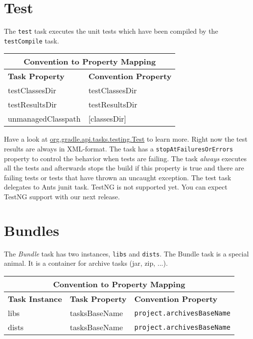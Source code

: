 \section{Test} %
\label{sec:test}
The \texttt{test} task executes the unit tests which have been compiled by the \texttt{testCompile} task. 
\begin{center}
	\begin{tabular}{|l|l|} \hline
		\multicolumn{2}{|c|}{Convention to Property Mapping} \\ \hline
	    \textbf{Task Property} & \textbf{Convention Property} \\ \hline
		testClassesDir & testClassesDir \\ \hline
		testResultsDir & testResultsDir \\ \hline
		unmanagedClasspath & [classesDir] \\ \hline
	\end{tabular} 
\end{center}
\noindent Have a look at \href{\API tasks/testing/Test.html}{org.gradle.api.tasks.testing.Test} to learn more. Right now the test results are always in XML-format. The task has a \texttt{stopAtFailuresOrErrors} property to control the behavior when tests are failing. The task \emph{always} executes all the tests and afterwards stops the build if this property is true and there are failing tests or tests that have thrown an uncaught exception. The test task delegates to Ants junit task. TestNG is not supported yet. You can expect TestNG support with our next release. 

\section{Bundles} %
\label{sec:bundles}
The \emph{Bundle} task has two instances, \texttt{libs} and \texttt{dists}. The Bundle task is a special animal. It is a container for archive tasks (jar, zip, ...).  
\begin{center}
	\begin{tabular}{|l|l|l|} \hline
		\multicolumn{3}{|c|}{Convention to Property Mapping} \\ \hline
		\textbf{Task Instance} & \textbf{Task Property} & \textbf{Convention Property} \\ \hline
		libs & tasksBaseName & \texttt{project.archivesBaseName} \\ \hline
		dists & tasksBaseName & \texttt{project.archivesBaseName} \\ \hline
	\end{tabular} 
\end{center}

